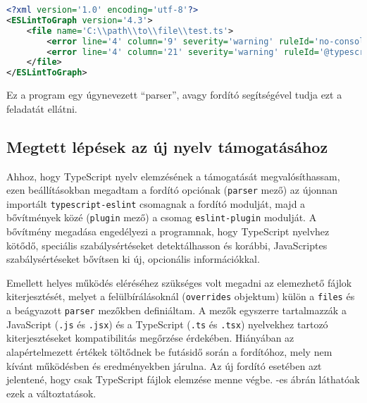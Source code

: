 \begin{lstlisting}[caption={ESLintRunner eredmény fájl példa},label={lst:eslintoutput}, language={xml},basicstyle=\fontsize{9}{11}\selectfont\ttfamily]
<?xml version='1.0' encoding='utf-8'?>
<ESLintToGraph version='4.3'>
    <file name='C:\\path\\to\\file\\test.ts'>
        <error line='4' column='9' severity='warning' ruleId='no-console' nodeType='MemberExpression' message='Unexpected console statement.' />
        <error line='4' column='21' severity='warning' ruleId='@typescript-eslint/restrict-plus-operands' nodeType='BinaryExpression' message='Operands of  &apos; + &apos;  operation must either be both strings or both numbers. Consider using a template literal.' />
    </file>
</ESLintToGraph>
\end{lstlisting}

Ez a program egy úgynevezett ``parser'', avagy fordító segítségével tudja ezt a feladatát ellátni.

\subsection{Megtett lépések az új nyelv támogatásához}

Ahhoz, hogy TypeScript nyelv elemzésének a támogatását megvalósíthassam, ezen beállításokban megadtam a fordító opciónak (\texttt{parser} mező) az újonnan importált \texttt{typescript-eslint} \cite{typescript-eslint} csomagnak a fordító modulját, majd a bővítmények közé (\texttt{plugin} mező) a csomag \texttt{eslint-plugin} modulját. 
A bővítmény megadása engedélyezi a programnak, hogy TypeScript nyelvhez kötődő, speciális szabálysértéseket detektálhasson és korábbi, JavaScriptes szabálysértéseket bővítsen ki új, opcionális információkkal. 

Emellett helyes működés eléréséhez szükséges volt megadni az elemezhető fájlok kiterjesztését, melyet a felülbírálásoknál (\texttt{overrides} objektum) külön a \texttt{files} és a beágyazott \texttt{parser} mezőkben definiáltam. A mezők egyszerre tartalmazzák a JavaScript (\texttt{.js} és \texttt{.jsx}) és a TypeScript (\texttt{.ts} és \texttt{.tsx}) nyelvekhez tartozó kiterjesztéseket kompatibilitás megőrzése érdekében. Hiányában az alapértelmezett értékek töltődnek be futásidő során a fordítóhoz, mely nem kívánt működésben és eredményekben járulna. Az új fordító esetében azt jelentené, hogy csak TypeScript fájlok elemzése menne végbe. -es ábrán láthatóak ezek a változtatások.

